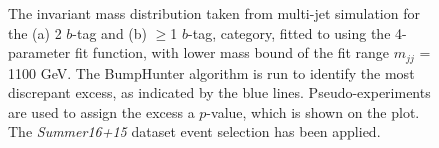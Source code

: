 \begin{figure}[!ht]
  \begin{center}
   \captionsetup[subfigure]{aboveskip=0pt,justification=centering}
  \end{center}
  \caption{ The invariant mass distribution taken from multi-jet simulation for the (a) 2 $b$-tag and (b) $\geq$1 $b$-tag,
   category, fitted to using the 4-parameter fit function, with lower mass bound of the fit range $m_{jj}$ = 1100 GeV.
   The BumpHunter algorithm is run to identify the most discrepant excess, as indicated by the blue lines.
   Pseudo-experiments are used to assign the excess a $p$-value, which is shown on the plot.    
   The \textit{Summer16+15} dataset event selection has been applied.}
 \label{fig:Short_4para_1100_figure1}
\end{figure}


